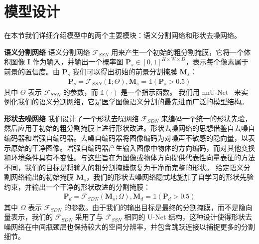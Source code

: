\section{模型设计}
在本节我们详细介绍模型中的两个主要模块：语义分割网络和形状去噪网络。

\textbf{语义分割网络} \quad 语义分割网络 $\mathcal{F}_{SSN}$ 用来产生一个初始的粗分割掩膜，它将一个体积图像 $\mathbf{I}$ 作为输入，并输出一个概率图 $\mathbf{P}_s \in [0,1]^{H\times W\times D}$，表示每个像素属于前景的置信度。由 $\mathbf{P}_s$ 我们可以得出初始的前景分割掩膜 $\mathbf{M}_s$：
\begin{align}
    \mathbf{P}_s = \mathcal{F}_{SSN} (\mathbf{I}; \Theta), \mathbf{M}_s = \mathds{1} (\mathbf{P}_s > 0.5)
\end{align}
其中 $\Theta$ 表示 $\mathcal{F}_{SSN}$ 的参数，而 $\mathds{1}(\cdot)$ 是一个指示函数。
我们用 nnU-Net~\citep{isensee2019automated} 来实例化我们的语义分割网络，它是医学图像语义分割的最先进而广泛的模型结构。


\textbf{形状去噪网络} \quad 我们设计了一个形状去噪网络 $\mathcal{F}_{SDN}$ 来编码一个统一的形状先验，然后应用于初始的粗分割掩膜上进行形状改进。形状去噪网络的思想借鉴自去噪自编码器\citep{vincent2010stacked}和增强自编码器\citep{Sundermeyer_2018_ECCV}。去噪自编码器将图像编码为对噪声不敏感的隐向量，以表示原始的干净图像。增强自编码器产生输入图像中物体的方向编码，而对其他变换和环境条件具有不变性。与这些旨在为图像或物体方向提供代表性向量表征的方法不同，我们的目标是将输入的粗分割掩膜恢复为干净而完整的形状。
给定语义分割网络输出的初始掩膜 $\mathbf{M}_s$，我们的形状去噪网络隐式地施加了自学习的形状先验约束，并输出一个干净的形状改进的分割掩膜：
\begin{align}
    \mathbf{P}_d = \mathcal{F}_{SDN} (\mathbf{M}_s; \Omega), \mathbf{M}_d = \mathds{1} (\mathbf{P}_d > 0.5)
\end{align}
其中 $\Omega$ 表示 $\mathcal{F}_{SDN}$ 的参数。由于我们的输出目标是最终的分割掩膜，而不是隐向量表示，我们的 $\mathcal{F}_{SDN}$ 采用了与 $\mathcal{F}_{SSN}$ 相同的 U-Net 结构，这种设计使得形状去噪网络在中间瓶颈层也保持较大的空间分辨率，并包含跳跃连接以捕捉更多的分割细节。

